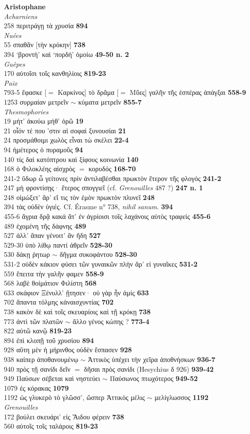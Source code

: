 \documentclass{book}%
\newcommand{\italique}[1]{\textit{#1}}%
\newcommand{\espace}[1]{\hspace{#1}}%
\newlength{\larg}%
\newcommand{\decalageN}[1]{%
\settowidth{\larg}{#1}%
\espace{-\larg}%
}
\newcommand{\Auteur}[1]{\hspace*{-1.5cm}\textbf{#1} \\}
\newcommand{\livre}[1]{\hspace*{0.5cm}#1\\}
\newcommand{\passage}[3]{\hspace*{1.0cm} #1 \hspace*{1.2cm}\decalageN{#1} #2 \dotfill \hfill	\textbf{#3}\\} %
\begin{document}
\Auteur{Aristophane}
\livre{\italique{Acharniens}}
\passage{258}{περιτράγῃ τὰ χρυσία}{894}
\livre{\italique{Nuées}}
\passage{55}{σπαθᾶν [τὴν κρόκην]}{738}
\passage{394}{`βροντὴ' καὶ `πορδή' ὁμοίω}{49-50 n. 2}
\livre{\italique{Guêpes}}
\passage{170}{αὐτοῖσι τοῖς κανθηλίοις}{819-23}
\livre{\italique{Paix}}
\passage{793-5}{ἔφασκε [$=$ Καρκίνος] τὸ δρᾶμα [$=$ Μῦες] γαλῆν τῆς ἑσπέρας ἀπάγξαι}{558-9}
\passage{1253}{συρμαίαν μετρεῖν $\sim$ κύματα μετρεῖν}{855-7}
\livre{\italique{Thesmophories}}
\passage{19}{μήτ' ἀκούω μήθ' ὁρῶ}{19}
\passage{21}{οἷόν τέ που ’στιν αἱ σοφαὶ ξυνουσίαι}{21}
\passage{24}{προσμάθοιμι χωλὸς εἶναι τὼ σκέλει}{22-4}
\passage{94}{ἡμέτερος ὁ πυραμοῦς}{94}
\passage{140}{τίς δαὶ κατόπτρου καὶ ξίφους κοινωνία}{140}
\passage{168}{ὁ Φιλοκλέης αἰσχρὸς $=$ κορυδός}{168-70}
\passage{241-2}{ὕδωρ ὦ γείτονες πρὶν ἀντιλαβέσθαι πρωκτὸν ἓτερον τῆς φλογός}{241-2}
\passage{247}{μὴ φροντίσῃς· ἕτερος σπογγιεῖ (cf. \italique{Grenouilles} 487 ?)}{247 n. 1}
\passage{248}{οἰμώξετ' ἄρ' εἴ τις τὸν ἐμὸν πρωκτὸν πλυνεῖ}{248}
\passage{394}{τὰς οὐδὲν ὑγιές. Cf. Érasme n° 738, \italique{nihil sanum}.}{394}
\passage{455-6}{ἄγρια δρᾷ κακά ἅτ' ἐν ἀγρίοισι τοῖς λαχάνοις αὐτὸς τραφείς}{455-6}
\passage{489}{ἐχομένη τῆς δάφνης}{489}
\passage{527}{ἀλλ' ἅπαν γένοιτ' ἂν ἤδη}{527}
\passage{529-30}{ὑπὸ λίθῳ παντί ἀθρεῖν}{528-30}
\passage{530}{δάκῃ ῥητωρ $\sim$ δῆγμα συκοφάντου}{528-30}
\passage{531-2}{οὐδὲν κάκιον φύσει τῶν γυναικῶν πλὴν ἄρ' εἰ γυναῖκες}{531-2}
\passage{559}{ἔπειτα τὴν γαλῆν φαμεν}{558-9}
\passage{568}{λαβὲ θοἰμάτιον Φιλίστη}{568}
\passage{633}{σκάφιον Ξένυλλ' ᾔτησεν· οὐ γὰρ ἦν ἀμίς}{633}
\passage{702}{ἅπαντα τόλμης κἀναισχυντίας}{702}
\passage{738}{κακὸν δὲ καὶ τοῖς σκευαρίοις καὶ τῇ κρόκῃ}{738}
\passage{773}{ἀντὶ τῶν πλατῶν $\sim$ ἄλλο γένος κώπης ?}{773-4}
\passage{822}{αὐτῶ κανῷ}{819-23}
\passage{894}{ἐπὶ κλοπῇ τοῦ χρυσίου}{894}
\passage{928}{αὕτη μὲν ἡ μήρινθος οὐδὲν ἔσπασεν}{928}
\passage{938}{καίπερ ἀποθανουμένῳ $\sim$ Ἀττικὸς ὑπέχει τὴν χεῖρα ἀποθνήσκων}{936-7}
\passage{940}{πρὸς τῇ σανίδι δεῖν $=$ δῆσαι πρὸς σανίδι (Hesychius δ 926)}{939-42}
\passage{949}{Παύσων σέβεται καὶ νηστεύει $\sim$ Παύσωνος πτωχότερος}{949-52}
\passage{1079}{ἐς κόρακας}{1079}
\passage{1192}{ὠς γλυκερὸ τὸ γλῶσσ', ὤσπερ Ἀττικὸς μέλις $\sim$ μελίγλωσσος}{1192}
\livre{\italique{Grenouilles}}
\passage{172}{βούλει σκευάρι' εἰς Ἅιδου φέρειν}{738}
\passage{560}{αὐτοῖς τοῖς ταλάροις}{819-23}
\end{document}

